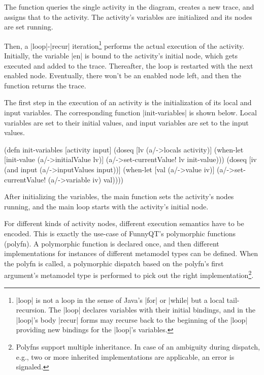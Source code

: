\documentclass[submission]{eptcs}
\newcommand{\code}{\clojureinline}
\begin{document}
The function queries the single activity in the diagram, creates a new trace,
and assigns that to the activity.  The activity's variables are initialized and
its nodes are set running.

Then, a \code|loop|-\code|recur| iteration\footnote{\code|loop| is not a loop
  in the sense of Java's \code|for| or \code|while| but a local tail-recursion.
  The \code|loop| declares variables with their initial bindings, and in the
  \code|loop|'s body \code|recur| forms may recurse back to the beginning of
  the \code|loop| providing new bindings for the \code|loop|'s variables.}
performs the actual execution of the activity.  Initially, the variable
\code|en| is bound to the activity's initial node, which gets executed and
added to the trace.  Thereafter, the loop is restarted with the next enabled
node.  Eventually, there won't be an enabled node left, and then the function
returns the trace.

The first step in the execution of an activity is the initialization of its
local and input variables.  The corresponding function \code|init-variables| is
shown below.  Local variables are set to their initial values, and input
variables are set to the input values.

\begin{clojurecode}
(defn init-variables [activity input]
  (doseq [lv (a/->locals activity)]
    (when-let [init-value (a/->initialValue lv)]
      (a/->set-currentValue! lv init-value)))
  (doseq [iv (and input (a/->inputValues input))]
    (when-let [val (a/->value iv)]
      (a/->set-currentValue! (a/->variable iv) val))))
\end{clojurecode}

After initializing the variables, the main function sets the activity's nodes
running, and the main loop starts with the activity's initial node.

For different kinds of activity nodes, different execution semantics have to be
encoded.  This is exactly the use-case of FunnyQT's polymorphic functions
(polyfn).  A polymorphic function is declared once, and then different
implementations for instances of different metamodel types can be defined.
When the polyfn is called, a polymorphic dispatch based on the polyfn's first
argument's metamodel type is performed to pick out the right
implementation\footnote{Polyfns support multiple inheritance.  In case of an
  ambiguity during dispatch, e.g., two or more inherited implementations are
  applicable, an error is signaled.}.
\end{document}
